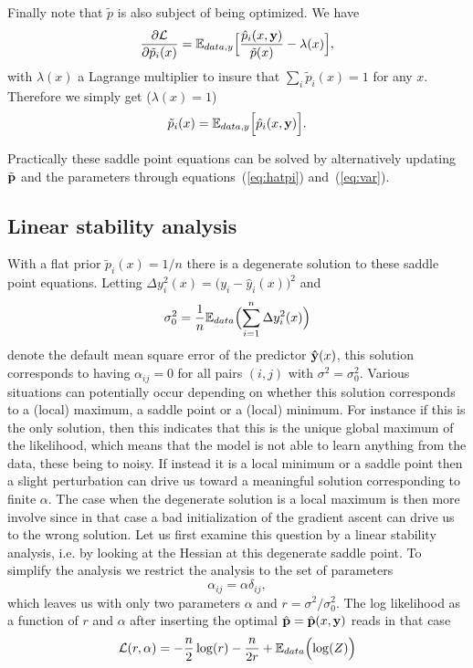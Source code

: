 \documentclass[envcountsect,runningheads]{llncs}
\theoremstyle{etoile}
\begin{document}
Finally note that $\tilde p$ is also subject of being optimized. We have
\[
\frac{\partial{\cal L}}{\partial \tilde p_i(x)} = {\mathbb E}_{data,y}\Bigl[\frac{\hat p_i(x,{\bf y})}{\tilde p(x)}-\lambda(x)\Bigr],
\]
with $\lambda(x)$ a Lagrange multiplier to insure that $\sum_i\tilde p_i(x)=1$ for any $x$. Therefore we simply get ($\lambda(x)=1$)
\begin{equation}\label{eq:tildep}
\tilde p_i(x) = {\mathbb E}_{data,y}\Bigl[\hat p_i(x,{\bf y})\Bigr].
\end{equation}

Practically these saddle point equations can be solved by alternatively updating $\tilde {\bf p}$
and the parameters through equations~(\ref{eq:hatpi}) and~(\ref{eq:var}).

\subsection{Linear stability analysis}
With a flat prior $\tilde p_i(x) = 1/n$ there is a degenerate solution to these saddle point equations.
Letting $\Delta y_i^2(x)= \bigl(y_i-\hat y_i(x)\bigr)^2$ and
\[
\sigma_0^2 = \frac{1}{n}{\mathbb E}_{data}\Bigl(\sum_{i=1}^n \Delta y_i^2(x)\Bigr)
\]
denote the default mean square error of the predictor ${\bf \hat y}(x)$, this solution corresponds to having $\alpha_{ij}=0$ for all
pairs $(i,j)$ with $\sigma^2=\sigma_0^2$. Various situations can potentially occur depending on whether this solution corresponds to a (local) maximum, a saddle point or a (local) 
minimum. For instance if this is the only solution, then this indicates that this is the unique global maximum of the likelihood, which means that the model is not able to learn
anything from the data, these being to noisy. If instead it is a local minimum or a saddle point then a slight perturbation can drive us toward a meaningful solution corresponding to finite $\alpha$.
The  case when the degenerate solution is a local maximum is then more involve since in that case a bad initialization of the gradient ascent can drive us to the wrong solution.
Let us first examine this question by a linear stability analysis, i.e. by looking at the Hessian at this degenerate saddle point. To simplify the analysis
we restrict the analysis to the set of parameters
\[
\alpha_{ij} = \alpha \delta_{ij},
\]
which leaves us with only two parameters $\alpha$ and $r = \sigma^2/\sigma_0^2$. The log likelihood as a function of $r$ and $\alpha$ after inserting the optimal
$\hat {\bf p} = \hat {\bf p}(x,{\bf y})$ reads in that case
\[
{\cal L}(r,\alpha) = -\frac{n}{2}\log(r)-\frac{n}{2r}+{\mathbb E}_{data}\Bigl(\log(Z)\Bigr)
\]
\end{document}
